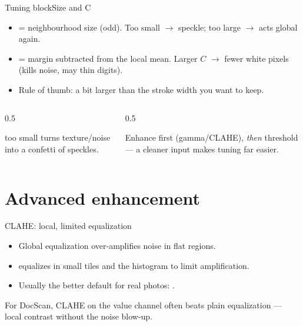 \documentclass[10pt,aspectratio=169]{beamer}
\begin{document}
\begin{frame}{Tuning blockSize and C}
  \begin{itemize}
    \item {} = neighbourhood size (odd). Too small $\rightarrow$ speckle; too large $\rightarrow$ acts global again.
    \item {} = margin subtracted from the local mean. Larger $C$ $\rightarrow$ fewer white pixels (kills noise, may thin digits).
    \item Rule of thumb:  a bit larger than the stroke width you want to keep.
  \end{itemize}
  \begin{columns}[T]
    \begin{column}{0.5\textwidth}
      \begin{badbox}
         too small turns texture/noise into a confetti of speckles.
      \end{badbox}
    \end{column}
    \begin{column}{0.5\textwidth}
      \begin{goodbox}
        Enhance first (gamma/CLAHE), \emph{then} threshold — a cleaner input makes tuning far easier.
      \end{goodbox}
    \end{column}
  \end{columns}
\end{frame}

\section{Advanced enhancement}

\begin{frame}{CLAHE: local, limited equalization}
  \begin{itemize}
    \item Global equalization over-amplifies noise in flat regions.
    \item {} equalizes in small tiles and  the histogram to limit amplification.
    \item Usually the better default for real photos: .
  \end{itemize}
  \begin{goodbox}
    For DocScan, CLAHE on the value channel often beats plain equalization — local contrast without the noise blow-up.
  \end{goodbox}
\end{frame}
\end{document}
